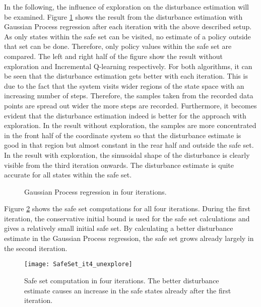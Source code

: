 \documentclass[../main.tex]{subfiles}
\begin{document}
In the following, the influence of exploration on the disturbance estimation will be examined. Figure \ref{fig:GP_it4_doubleexplore} shows the result from the disturbance estimation with Gaussian Process regression after each iteration with the above described setup. As only states within the safe set can be visited, no estimate of a policy outside that set can be done. Therefore, only policy values within the safe set are compared. The left and right half of the figure show the result without exploration and Incremental Q-learning respectively. For both algorithms, it can be seen that the disturbance estimation gets better with each iteration. This is due to the fact that the system visits wider regions of the state space with an increasing number of steps. Therefore, the samples taken from the recorded data points are spread out wider the more steps are recorded. Furthermore, it becomes evident that the disturbance estimation indeed is better for the approach with exploration. In the result without exploration, the samples are more concentrated in the front half of the coordinate system so that the disturbance estimate is good in that region but almost constant in the rear half and outside the safe set. In the result with exploration, the sinusoidal shape of the disturbance is clearly visible from the third iteration onwards. The disturbance estimate is quite accurate for all states within the safe set. 

\begin{figure}[H]
    \centering
        \caption{Gaussian Process regression in four iterations.}  \label{fig:GP_it4_doubleexplore}
\end{figure}


Figure \ref{fig:SafeSet_it4_unexplore} shows the safe set computations for all four iterations. During the first iteration, the conservative initial bound is used for the safe set calculations and gives a relatively small initial safe set. By calculating a better disturbance estimate in the Gaussian Process regression, the safe set grows already largely in the second iteration. 
\begin{figure}[h]
    \centering
    \texttt{[image: SafeSet\_it4\_unexplore]}
        \caption{Safe set computation in four iterations. The better disturbance estimate causes an increase in the safe states already after the first iteration.}  \label{fig:SafeSet_it4_unexplore}
\end{figure}
\end{document}
